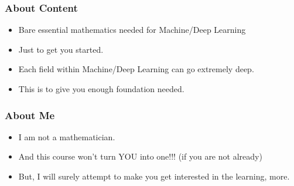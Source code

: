  \begin{frame}[fragile]\frametitle{About Content}
\begin{itemize}
\item Bare essential mathematics needed for Machine/Deep Learning
\item Just to get you started.
\item Each field within Machine/Deep Learning can go extremely deep.
\item This is to give you enough foundation needed.
\end{itemize}
\end{frame}

 \begin{frame}[fragile]\frametitle{About Me}
\begin{itemize}
\item I am not a mathematician.
\item And this course won't turn YOU into one!!! (if you are not already)
\item But, I will surely attempt to make you get interested in the learning, more.
\end{itemize}
\end{frame}


